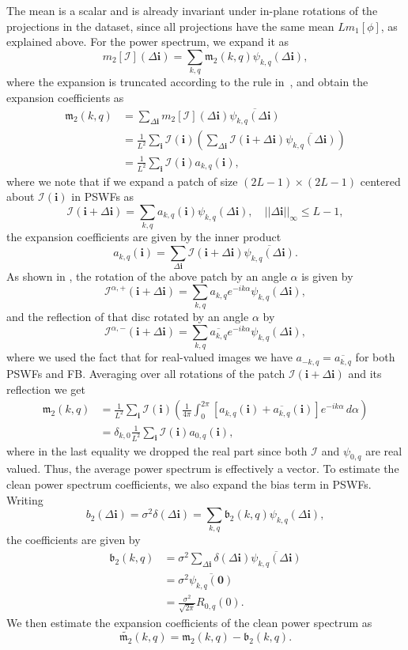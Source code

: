 \documentclass[english,11pt]{article}
\newcommand{\1}{\mathbf{1}}
\newcommand{\II}{\mathcal{I}}
\newcommand{\mb}{\mathbf}
\newcommand{\mk}{\mathfrak}
\numberwithin{equation}{section}
\theoremstyle{plain}
\theoremstyle{definition}
\theoremstyle{remark}
\theoremstyle{plain}
\theoremstyle{remark}
\theoremstyle{plain}
\theoremstyle{plain}
\begin{document}
The mean is a scalar and is already invariant under in-plane rotations of the projections in the dataset, since all projections have the same mean $Lm_1[\phi]$, as explained above. For the power spectrum, we expand it as
\[ m_2[\II](\Delta\mb i) =
\sum_{k,q}\mathfrak{m}_2(k,q)\psi_{k,q}(\Delta\mb i),\]
where the expansion is truncated according to the rule in~\cite{landa2017steerable}, and obtain the expansion coefficients as
\[\begin{aligned} 
\mathfrak{m}_2(k,q) &=
\sum_{\Delta\mb i}m_2[\II](\Delta\mb i)\overline{\psi_{k,q}(\Delta\mb i)}\\
&=
\frac{1}{L^2}\sum_{\mb i}\II(\mb i)\left(\sum_{\Delta\mb i}\II(\mb i+\Delta\mb i)\overline{\psi_{k,q}(\Delta\mb i)}\right)\\
&= \frac{1}{L^2}\sum_{\mb i}\II(\mb i)a_{k,q}(\mb i), \end{aligned}\]
where we note that if we expand a patch of size $(2L-1) \times (2L-1)$ centered about $\II(\mb i)$ in PSWFs as
\[ \II(\mb i + \Delta\mb i) = \sum_{k,q}a_{k,q}(\mb i)\psi_{k,q}(\Delta\mb i),\quad ||\Delta\mb i||_{\infty}\leq L-1,\]
the expansion coefficients are given by the inner product
\[ a_{k,q}(\mb i) = \sum_{\Delta\mb i}\II(\mb i + \Delta\mb i)\overline{\psi_{k,q}(\Delta\mb i)}.\]
As shown in \cite{landa2017steerable, zhao2016fast}, the rotation of the above patch by an angle $\alpha$ is given by
\[ \II^{\alpha,+}(\mb i+\Delta\mb i) = \sum_{k,q}a_{k,q}e^{-ik\alpha}\psi_{k,q}(\Delta\mb i),\]
and the reflection of that disc rotated by an angle $\alpha$ by
\[ \II^{\alpha,-}(\mb i+\Delta\mb i) = \sum_{k,q}\overline{a_{k,q}}e^{-ik\alpha}\psi_{k,q}(\Delta\mb i),\]
where we used the fact that for real-valued images we have $a_{-k,q}=\overline{a_{k,q}}$ for both PSWFs and FB. Averaging over all rotations of the patch $\II(\mb i + \Delta\mb i)$ and its reflection we get
\[\begin{aligned} 
\mathfrak{m}_2(k,q) &= \frac{1}{L^2}\sum_{\mb i}\II(\mb i)\left(\frac{1}{4\pi}\int_0^{2\pi}[a_{k,q}(\mb i) +
\overline{a_{k,q}}(\mb i)]e^{-ik\alpha}\, d\alpha\right)\\ 
&= \delta_{k,0} \frac{1}{L^2}\sum_{\mb i}\II(\mb i)a_{0,q}(\mb i), \end{aligned}\]
where in the last equality we dropped the real part since both
$\II$ and $\psi_{0,q}$ are real valued.
Thus, the average power spectrum is effectively a vector. To estimate the clean power spectrum coefficients, we also expand the bias term in PSWFs. Writing
\[ b_2(\Delta\mb i) = \sigma^2\delta(\Delta\mb i) = \sum_{k,q}\mathfrak{b}_2(k,q)\psi_{k,q}(\Delta\mb i),\]
the coefficients are given by
\[\begin{aligned} 
\mathfrak{b}_2(k,q) &= \sigma^2\sum_{\Delta\mb i}\delta(\Delta\mb i)\overline{\psi_{k,q}(\Delta\mb i)}\\
&= \sigma^2\overline{\psi_{k,q}(\mb 0)}\\
&= \frac{\sigma^2}{\sqrt{2\pi}}R_{0,q}(0). \end{aligned}\]
We then estimate the expansion coefficients of the clean power spectrum as
\[ \widetilde{\mk m_2}(k,q) = \mk m_2(k,q) - \mk b_2(k,q).\]
\end{document}
